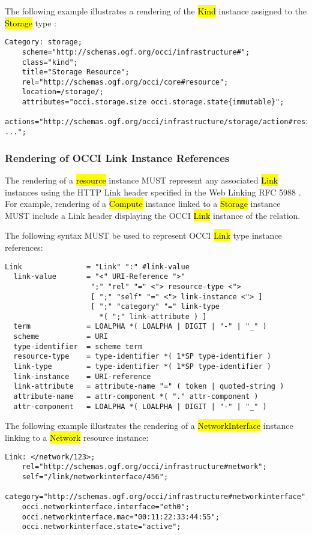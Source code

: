 \documentclass[10pt,a4paper]{article}
\begin{document}
The following example illustrates a rendering of the \hl{Kind}
instance assigned to the \hl{Storage} type \cite{occi:infrastructure}:

\begin{verbatim}
Category: storage;
    scheme="http://schemas.ogf.org/occi/infrastructure#";
    class="kind";
    title="Storage Resource";
    rel="http://schemas.ogf.org/occi/core#resource";
    location=/storage/;
    attributes="occi.storage.size occi.storage.state{immutable}";
    actions="http://schemas.ogf.org/occi/infrastructure/storage/action#resize ...";
\end{verbatim}

\subsubsection{Rendering of OCCI Link Instance References}
The rendering of a \hl{resource} instance \cite{occi:core} MUST
represent any associated \hl{Link} instances using the HTTP Link
header specified in the Web Linking RFC 5988 \cite{rfc5988}.  For
example, rendering of a \hl{Compute} instance linked to a \hl{Storage}
instance MUST include a Link header displaying the OCCI \hl{Link}
instance of the relation.

The following syntax MUST be used to represent OCCI \hl{Link} type
instance references:

\begin{verbatim}
Link               = "Link" ":" #link-value
  link-value       = "<" URI-Reference ">"
                    ";" "rel" "=" <"> resource-type <">
                    [ ";" "self" "=" <"> link-instance <"> ]
                    [ ";" "category" "=" link-type
                      *( ";" link-attribute ) ]
  term             = LOALPHA *( LOALPHA | DIGIT | "-" | "_" )
  scheme           = URI
  type-identifier  = scheme term
  resource-type    = type-identifier *( 1*SP type-identifier )
  link-type        = type-identifier *( 1*SP type-identifier )
  link-instance    = URI-reference
  link-attribute   = attribute-name "=" ( token | quoted-string )
  attribute-name   = attr-component *( "." attr-component )
  attr-component   = LOALPHA *( LOALPHA | DIGIT | "-" | "_" )
\end{verbatim}

The following example illustrates the rendering of a
\hl{NetworkInterface} \cite{occi:infrastructure} instance linking to a
\hl{Network} resource instance:

\begin{verbatim}
Link: </network/123>;
    rel="http://schemas.ogf.org/occi/infrastructure#network";
    self="/link/networkinterface/456";
    category="http://schemas.ogf.org/occi/infrastructure#networkinterface";
    occi.networkinterface.interface="eth0";
    occi.networkinterface.mac="00:11:22:33:44:55";
    occi.networkinterface.state="active";
\end{verbatim}
\end{document}
